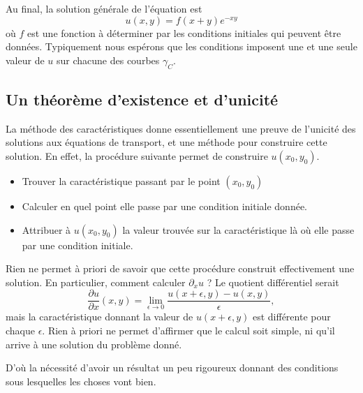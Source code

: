 Au final, la solution générale de l'équation est
\begin{equation}
    u(x,y)=f(x+y) e^{-xy}
\end{equation}
où \( f\) est une fonction à déterminer par les conditions initiales qui peuvent être données. Typiquement nous espérons que les conditions imposent une et une seule valeur de \( u\) sur chacune des courbes \( \gamma_C\).

\subsection{Un théorème d'existence et d'unicité}

La méthode des caractéristiques donne essentiellement une preuve de l'unicité des solutions aux équations de transport, et une méthode pour construire cette solution. En effet, la procédure suivante permet de construire \( u(x_0,y_0)\).
\begin{itemize}
    \item Trouver la caractéristique passant par le point \( (x_0,y_0)\)
    \item Calculer en quel point elle passe par une condition initiale donnée.
    \item Attribuer à \( u(x_0,y_0)\) la valeur trouvée sur la caractéristique là où elle passe par une condition initiale.
\end{itemize}
Rien ne permet à priori de savoir que cette procédure construit effectivement une solution. En particulier, comment calculer \( \partial_xu\) ? Le quotient différentiel serait
\begin{equation}
    \frac{ \partial u }{ \partial x }(x,y)=\lim_{\epsilon\to 0}\frac{ u(x+\epsilon,y)-u(x,y) }{ \epsilon },
\end{equation}
mais la caractéristique donnant la valeur de \( u(x+\epsilon,y)\) est différente pour chaque \( \epsilon\). Rien à priori ne permet d'affirmer que le calcul soit simple, ni qu'il arrive à une solution du problème donné.

D'où la nécessité d'avoir un résultat un peu rigoureux donnant des conditions sous lesquelles les choses vont bien.


